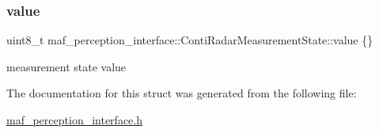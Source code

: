 \subsubsection{\texorpdfstring{value}{value}}
{\footnotesize\ttfamily uint8\+\_\+t maf\+\_\+perception\+\_\+interface\+::\+Conti\+Radar\+Measurement\+State\+::value \{\}}



measurement state value 



The documentation for this struct was generated from the following file\+:\begin{DoxyCompactItemize}
\item 
\hyperlink{maf__perception__interface_8h}{maf\+\_\+perception\+\_\+interface.\+h}\end{DoxyCompactItemize}
